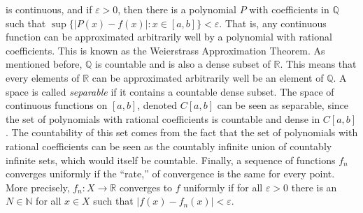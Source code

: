 \documentclass[crop=false,class=article,oneside]{standalone}
\begin{document}
            is continuous, and if $\varepsilon>0$, then there is
            a polynomial $P$ with coefficients in $\mathbb{Q}$
            such that $\sup\{|P(x)-f(x)|:x\in[a,b]\}<\varepsilon$.
            That is, any continuous function can be approximated
            arbitrarily well by a polynomial with rational
            coefficients. This is known as the
            Weierstrass Approximation Theorem. As mentioned
            before, $\mathbb{Q}$ is countable and is also
            a dense subset of $\mathbb{R}$. This means that
            every elements of $\mathbb{R}$ can be approximated
            arbitrarily well be an element of $\mathbb{Q}$. A
            space is called \textit{separable} if it contains
            a countable dense subset. The space of continuous
            functions on $[a,b]$, denoted $C[a,b]$ can be seen
            as separable, since the set of polynomials with
            rational coefficients is countable and dense in
            $C[a,b]$. The countability of this set comes from
            the fact that the set of polynomials with rational
            coefficients can be seen as the countably infinite
            union of countably infinite sets, which would itself
            be countable. Finally, a sequence of functions
            $f_{n}$ converges uniformly if the ``rate,'' of
            convergence is the same for every point. More precisely,
            $f_{n}:X\rightarrow\mathbb{R}$ converges to $f$
            uniformly if for all $\varepsilon>0$ there is an
            $N\in\mathbb{N}$ for all $x\in{X}$ such that
            $|f(x)-f_{n}(x)|<\varepsilon$.
\end{document}
